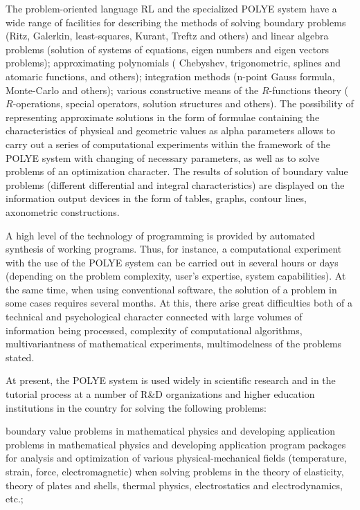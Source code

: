 The problem-oriented language RL and the specialized POLYE system have a
wide range of facilities for describing the methods of solving boundary
problems (Ritz, Galerkin, least-squares, Kurant, Treftz and others) and
linear algebra problems (solution of systems of equations, eigen numbers and
eigen vectors problems); approximating polynomials ( Chebyshev,
trigonometric, splines and atomaric functions, and others); integration
methods (n-point Gauss formula, Monte-Carlo and others); various
constructive means of the $R$-functions theory ($R$-operations, special
operators, solution structures and others). The possibility of representing
approximate solutions in the form of formulae containing the characteristics
of physical and geometric values as alpha parameters allows to carry out a
series of computational experiments within the framework of the POLYE system
with changing of necessary parameters, as well as to solve problems of an
optimization character. The results of solution of boundary value problems
(different differential and integral characteristics) are displayed on the
information output devices in the form of tables, graphs, contour lines,
axonometric constructions.

A high level of the technology of programming is provided by automated
synthesis of working programs. Thus, for instance, a computational
experiment with the use of the POLYE system can be carried out in several
hours or days (depending on the problem complexity, user's expertise, system
capabilities). At the same time, when using conventional software, the
solution of a problem in some cases requires several months. At this, there
arise great difficulties both of a technical and psychological character
connected with large volumes of information being processed, complexity of
computational algorithms, multivariantness of mathematical experiments,
multimodelness of the problems stated.

At present, the POLYE system is used widely in scientific research and in
the tutorial process at a number of R\&D organizations and higher education
institutions in the country for solving the following problems:

boundary value problems in mathematical physics and developing application
problems in mathematical physics and developing application program packages
for analysis and optimization of various physical-mechanical fields
(temperature, strain, force, electromagnetic) when solving problems in the
theory of elasticity, theory of plates and shells, thermal physics,
electrostatics and electrodynamics, etc.;

